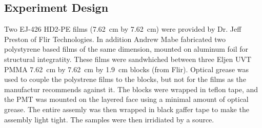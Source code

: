 \documentclass[draftcls,onecolumn]{IEEEtran}
\begin{document}
\subsection{Experiment Design}
Two EJ-426 HD2-PE films (\SI{7.62}{\cm} by \SI{7.62}{\cm}) were provided by Dr. Jeff Preston of Flir Technologies.
In addition Andrew Mabe fabricated two polystyrene based films of the same dimension, mounted on aluminum foil for structural integratity.
These films were sandwhiched between three Eljen UVT PMMA \SI{7.62}{\cm} by \SI{7.62}{\cm} by \SI{1.9}{\cm} blocks (from Flir).
Optical grease was used to couple the polystrene films to the blocks, but not for the  films as the manufactur recommends against it.
The blocks were wrapped in teflon tape, and the PMT was mounted on the layered face using a minimal amount of optical grease.
The entire assemly was then wrapped in black gaffer tape to make the assembly light tight.
The samples were then irridiated by a  source.
\end{document}
